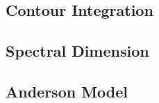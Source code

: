 \documentclass[12pt]{article}
\numberwithin{equation}{section}
\newcommand{\1}{\mathbb{1}}
\begin{document}
\subsection{Contour Integration}
\subsection{Spectral Dimension}



\subsection{Anderson Model}

\printbibliography
\end{document}
